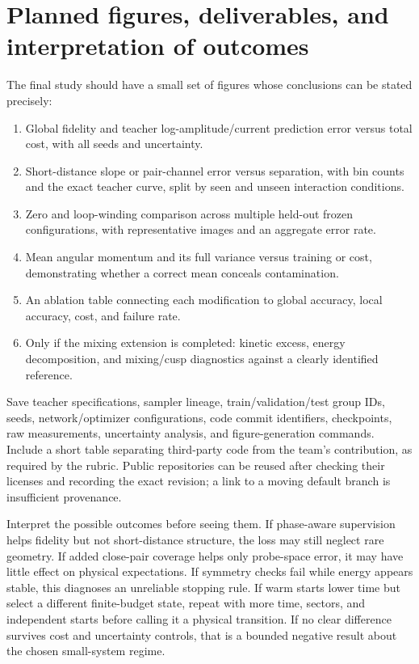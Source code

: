 \documentclass[11pt,letterpaper]{article}
\begin{document}
\section{Planned figures, deliverables, and interpretation of outcomes}
\label{sec:deliverables}

The final study should have a small set of figures whose conclusions can be stated precisely:
\begin{enumerate}
\item Global fidelity and teacher log-amplitude/current prediction error versus total cost, with all seeds and uncertainty.
\item Short-distance slope or pair-channel error versus separation, with bin counts and the exact teacher curve, split by seen and unseen interaction conditions.
\item Zero and loop-winding comparison across multiple held-out frozen configurations, with representative images and an aggregate error rate.
\item Mean angular momentum and its full variance versus training or cost, demonstrating whether a correct mean conceals contamination.
\item An ablation table connecting each modification to global accuracy, local accuracy, cost, and failure rate.
\item Only if the mixing extension is completed: kinetic excess, energy decomposition, and mixing/cusp diagnostics against a clearly identified reference.
\end{enumerate}

Save teacher specifications, sampler lineage, train/validation/test group IDs, seeds, network/optimizer configurations, code commit identifiers, checkpoints, raw measurements, uncertainty analysis, and figure-generation commands. Include a short table separating third-party code from the team's contribution, as required by the rubric. Public repositories can be reused after checking their licenses and recording the exact revision; a link to a moving default branch is insufficient provenance.

Interpret the possible outcomes before seeing them. If phase-aware supervision helps fidelity but not short-distance structure, the loss may still neglect rare geometry. If added close-pair coverage helps only probe-space error, it may have little effect on physical expectations. If symmetry checks fail while energy appears stable, this diagnoses an unreliable stopping rule. If warm starts lower time but select a different finite-budget state, repeat with more time, sectors, and independent starts before calling it a physical transition. If no clear difference survives cost and uncertainty controls, that is a bounded negative result about the chosen small-system regime.
\end{document}
